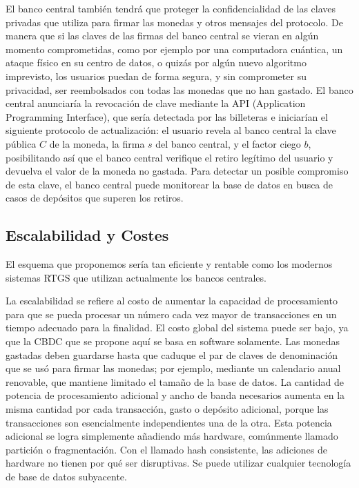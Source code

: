 \documentclass[10pt,spanish]{article}
\begin{document}
El banco central también tendrá que proteger la confidencialidad de las
claves privadas que utiliza para firmar las monedas y otros mensajes del
protocolo. De manera que si las claves de las firmas del banco central
se vieran en algún momento comprometidas, como por ejemplo por una
computadora cuántica, un ataque físico en su centro de datos, o quizás
por algún nuevo algoritmo imprevisto, los usuarios puedan de forma
segura, y sin comprometer su privacidad, ser reembolsados con todas las
monedas que no han gastado. El banco central anunciaría la revocación de
clave mediante la API (Application Programming Interface), que sería
detectada por las billeteras e iniciarían el siguiente protocolo de
actualización: el usuario revela al banco central la clave pública
$C$ de la moneda, la firma $s$ del banco central, y el factor
ciego $b$, posibilitando así que el banco central verifique el
retiro legítimo del usuario y devuelva el valor de la moneda no gastada.
Para detectar un posible compromiso de esta clave, el banco central
puede monitorear la base de datos en busca de casos de depósitos que
superen los retiros.

\hypertarget{escalabilidad-y-costes}{%
\subsection{Escalabilidad y Costes}\label{escalabilidad-y-costes}}

El esquema que proponemos sería tan eficiente y rentable como los
modernos sistemas RTGS que utilizan actualmente los bancos centrales.

La escalabilidad se refiere al costo de aumentar la capacidad de
procesamiento para que se pueda procesar un número cada vez mayor de
transacciones en un tiempo adecuado para la finalidad. El costo global
del sistema puede ser bajo, ya que la CBDC que se propone aquí se basa
en software solamente. Las monedas gastadas deben guardarse hasta que
caduque el par de claves de denominación que se usó para firmar las
monedas; por ejemplo, mediante un calendario anual renovable, que
mantiene limitado el tamaño de la base de datos. La cantidad de potencia
de procesamiento adicional y ancho de banda necesarios aumenta en la
misma cantidad por cada transacción, gasto o depósito adicional, porque
las transacciones son esencialmente independientes una de la otra. Esta
potencia adicional se logra simplemente añadiendo más hardware,
comúnmente llamado partición o fragmentación. Con el llamado hash
consistente, las adiciones de hardware no tienen por qué ser
disruptivas. Se puede utilizar cualquier tecnología de base de datos
subyacente.
\end{document}
